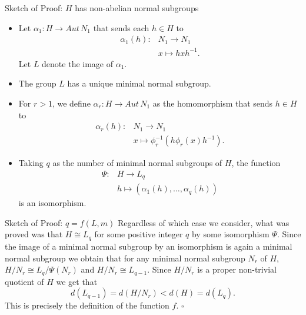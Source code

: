 \documentclass{beamer}
\newcommand{\aut}[1]{Aut\, {#1}}
\begin{document}
\begin{frame}{Sketch of Proof: $H$ has non-abelian normal subgroups}
    \begin{itemize}
        \item Let $\alpha_1 \colon H \rightarrow \aut N_1$ that sends each $h \in H$ to
        \begin{align*}
            \alpha_1(h) \colon &N_1 \rightarrow N_1 \\
                            &x \mapsto hxh^{-1}.
        \end{align*} Let $L$ denote the image of $\alpha_1$.
        \item<2-> The group $L$ has a unique minimal normal subgroup.
        \item<3-> For $r > 1$, we define $\alpha_r \colon H \rightarrow \aut N_1$ as the homomorphism that sends $h \in H$ to
        \begin{align*}
            \alpha_r(h) \colon &N_1 \rightarrow N_1 \\
                            &x \mapsto \phi_r^{-1}(h\phi_r(x)h^{-1}).
        \end{align*}
        \item<4-> Taking $q$ as the number of minimal normal subgroups of $H$, the function
        \begin{align*}
            \Psi \colon &H \rightarrow L_q \\
                        &h \mapsto (\alpha_1(h),\ldots , \alpha_q(h))
        \end{align*}
        is an isomorphism.
    \end{itemize}
\end{frame}

\begin{frame}{Sketch of Proof: $q = f(L, m)$}
    Regardless of which case we consider, what was proved was that $H \cong L_q$ for some positive integer $q$ by some isomorphism $\Psi$. Since the image of a minimal normal subgroup by an isomorphism is again a minimal normal subgroup we obtain that for any minimal normal subgroup $N_r$ of $H$, $H/N_r \cong L_{q}/\Psi(N_r)$ and $H/N_r \cong L_{q-1}$. Since $H/N_r$ is a proper non-trivial quotient of $H$ we get that
    $$
    d(L_{q-1}) = d(H/N_r) < d(H) = d(L_q).
    $$
    This is precisely the definition of the function $f$. $\square$


\end{frame}
\end{document}
